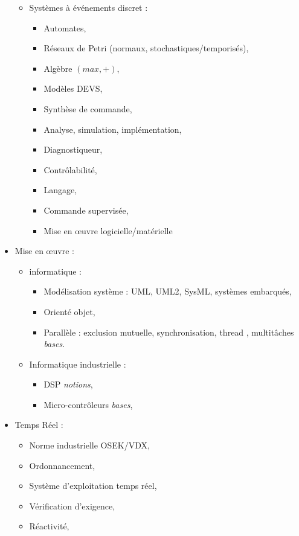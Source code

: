 \documentclass{article}
\begin{document}
\begin{itemize}
\begin{itemize}
\begin{itemize}
		\end{itemize}
	\item Systèmes à événements discret :
		\begin{itemize}
		\item Automates, 
		\item Réseaux de Petri (normaux, stochastiques/temporisés), 
		\item Algèbre $(max,+)$,
		\item Modèles DEVS,
		\item Synthèse de commande, 
		\item Analyse, simulation, implémentation, 
		\item Diagnostiqueur, 
		\item Contrôlabilité,
		\item Langage, 
		\item Commande supervisée,
		\item Mise en \oe uvre logicielle/matérielle
		\end{itemize}
	\end{itemize}
	
	
\item Mise en \oe uvre :
\begin{itemize}
\item informatique : %
	\begin{itemize}
	\item Modélisation système : UML, UML2, SysML, systèmes embarqués,
	\item Orienté objet,
	\item Parallèle : exclusion mutuelle, synchronisation, thread , multitâches \textit{bases}.
	\end{itemize}
	
\item Informatique industrielle :
	\begin{itemize}
	\item DSP \textit{notions},
	\item Micro-contrôleurs \textit{bases},
	\end{itemize}
\end{itemize}	
	
	
	
\item Temps Réel : 
	\begin{itemize}
	\item Norme industrielle OSEK/VDX,
	\item Ordonnancement, 
	\item Système d'exploitation temps réel,
	\item Vérification d’exigence, 
	\item Réactivité,
	\end{itemize}	
	

\end{itemize}
\end{document}
